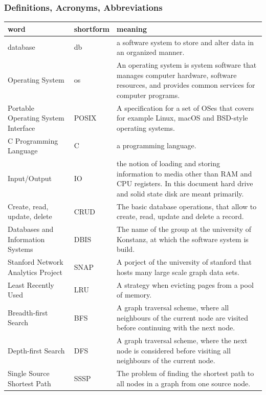     \subsubsection{Definitions, Acronyms, Abbreviations}
	\begin{longtable}{|>{\raggedright \arraybackslash}p{}||
	>{\raggedright \arraybackslash}p{}|>{\raggedright \arraybackslash}p{}|} \hline

	word & shortform & meaning \\ \hline
	database & db & a software system to store and alter data in an organized manner. \\ \hline
	Operating System & os & An operating system is system software that manages computer hardware, software resources, and provides common services for computer programs. \\ \hline
    Portable Operating System Interface & POSIX & A specification for a set of OSes that covers for example Linux, macOS and BSD-style operating systems. \\ \hline
	C Programming Language & C & a programming language. \\ \hline
	Input/Output & IO & the notion of loading and storing information to media other than RAM and CPU registers. In this document hard drive and solid state disk are meant primarily. \\ \hline
	Create, read, update, delete & CRUD & The basic database operations, that allow to create, read, update and delete a record. \\ \hline
	Databases and Information Systems & DBIS & The name of the group at the university of Konstanz, at which the software system is build. \\ \hline
	Stanford Network Analytics Project & SNAP & A porject of the university of stanford that hosts many large scale graph data sets.  \\ \hline
	Least Recently Used & LRU & A strategy when evicting pages from a pool of memory. \\ \hline
	Breadth-first Search & BFS & A graph traversal scheme, where all neighbours of the current node are visited before continuing with the next node. \\ \hline
	Depth-first Search & DFS & A graph traversal scheme, where the next node is considered before visiting all neighbours of the current node. \\ \hline
	Single Source Shortest Path & SSSP & The problem of finding the shortest path to all nodes in a graph from one source node. \\ \hline
	\end{longtable}


